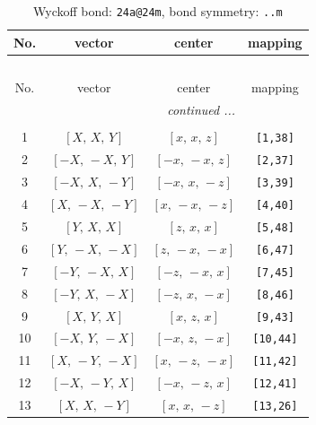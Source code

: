 \documentclass[fleqn,8pt]{jsarticle}
\begin{document}
\begin{longtable}{cccc}
\caption{Wyckoff bond: {\tt 24a@24m}, bond symmetry: {\tt ..m}}
 \\
 \hline \hline
No. & vector & center & mapping \\ \hline \endfirsthead

\multicolumn{3}{l}{\tablename\ \thetable{}} \\
 \hline \hline
No. & vector & center & mapping \\ \hline \endhead

 \hline \hline
\multicolumn{3}{r}{\footnotesize\it continued ...} \\ \endfoot

 \hline \hline
\multicolumn{3}{r}{} \\ \endlastfoot

1 & $\left[ X,\, X,\, Y \right]$ & $\left[ x,\, x,\, z \right]$ & {\tt [1,38]} \\ \hline
2 & $\left[ - X,\, - X,\, Y \right]$ & $\left[ - x,\, - x,\, z \right]$ & {\tt [2,37]} \\ \hline
3 & $\left[ - X,\, X,\, - Y \right]$ & $\left[ - x,\, x,\, - z \right]$ & {\tt [3,39]} \\ \hline
4 & $\left[ X,\, - X,\, - Y \right]$ & $\left[ x,\, - x,\, - z \right]$ & {\tt [4,40]} \\ \hline
5 & $\left[ Y,\, X,\, X \right]$ & $\left[ z,\, x,\, x \right]$ & {\tt [5,48]} \\ \hline
6 & $\left[ Y,\, - X,\, - X \right]$ & $\left[ z,\, - x,\, - x \right]$ & {\tt [6,47]} \\ \hline
7 & $\left[ - Y,\, - X,\, X \right]$ & $\left[ - z,\, - x,\, x \right]$ & {\tt [7,45]} \\ \hline
8 & $\left[ - Y,\, X,\, - X \right]$ & $\left[ - z,\, x,\, - x \right]$ & {\tt [8,46]} \\ \hline
9 & $\left[ X,\, Y,\, X \right]$ & $\left[ x,\, z,\, x \right]$ & {\tt [9,43]} \\ \hline
10 & $\left[ - X,\, Y,\, - X \right]$ & $\left[ - x,\, z,\, - x \right]$ & {\tt [10,44]} \\ \hline
11 & $\left[ X,\, - Y,\, - X \right]$ & $\left[ x,\, - z,\, - x \right]$ & {\tt [11,42]} \\ \hline
12 & $\left[ - X,\, - Y,\, X \right]$ & $\left[ - x,\, - z,\, x \right]$ & {\tt [12,41]} \\ \hline
13 & $\left[ X,\, X,\, - Y \right]$ & $\left[ x,\, x,\, - z \right]$ & {\tt [13,26]} \\ \hline

\end{longtable}
\end{document}
